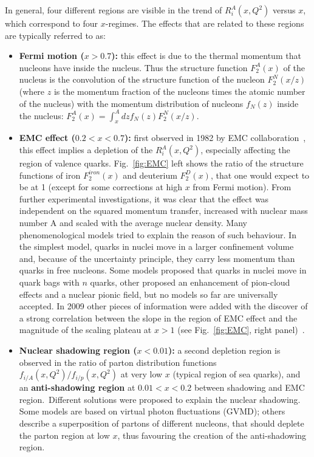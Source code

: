 In general, four different regions are visible in the trend of $R_i^A(x,Q^2)$ versus $x$,
which correspond to four $x$-regimes. The effects that are related to these regions are typically referred to as:
\begin{itemize}
\item {\bf Fermi motion ($x > 0.7$):} this effect is due to the 
thermal momentum that nucleons have inside the nucleus. Thus the structure function $F^A_2(x)$ of the nucleus
is the convolution of the structure function of the nucleon $F^N_2(x/z)$ (where $z$ is the momentum fraction
of the nucleons times the atomic number of the nucleus) with the momentum distribution
of nucleons $f_N(z)$ inside the nucleus: $F^A_2(x) = \int_x^A dz f_N(z) F_2^N(x/z)$.
\item {\bf EMC effect ($0.2 < x < 0.7$):} first observed in 1982 by EMC collaboration~\cite{Aubert:1983xm},
this effect implies a depletion of the  $R_i^A(x,Q^2)$, especially affecting the region 
of valence quarks. Fig.~\ref{fig:EMC} left shows the ratio of the structure functions 
of iron $F^{iron}_2(x)$ and deuterium $F^D_2(x)$, that one would expect to be at 1 (except for 
some corrections at high $x$ from Fermi motion). From further
experimental investigations, it was clear that the effect was independent on the 
squared momentum transfer, increased with nuclear mass number A and scaled with the average nuclear density. 
Many phenomenological models tried to explain the reason of such behaviour. In the simplest model, 
quarks in nuclei move in a larger confinement volume and, because of the uncertainty principle, 
they carry less momentum than quarks in free nucleons. Some models proposed that 
quarks in nuclei move in quark bags with $n$ quarks, other proposed an enhancement 
of pion-cloud effects and a nuclear pionic field, but no models so far are universally accepted. 
 In 2009 other pieces of information were added with the
discover of a strong correlation between the slope in the region of EMC effect and the magnitude of the scaling plateau 
at $x > 1$ (see Fig.~\ref{fig:EMC}, right panel)~\cite{Seely:2009gt}.
\item {\bf Nuclear shadowing region ($x < 0.01$):} a second depletion region
is observed in the ratio of parton distribution functions $f_{i/A}(x,Q^2) / f_{i/p}(x,Q^2)$ 
at very low $x$ (typical region of sea quarks), and
an {\bf anti-shadowing region} at $0.01 < x < 0.2$ between shadowing and 
EMC region.~Different solutions were
proposed to explain the nuclear shadowing. Some models are based on virtual 
photon fluctuations (GVMD); others
describe a superposition of partons of different nucleons, that should deplete the 
parton region at low $x$, thus favouring
the creation of the anti-shadowing region.

\end{itemize}


